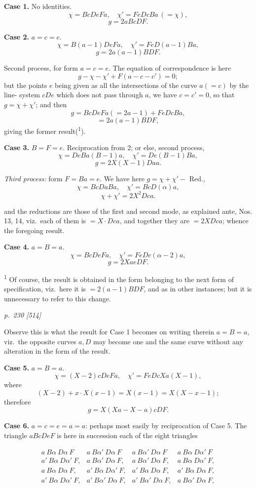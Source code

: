 \documentclass[11pt,a4paper]{article}
\theoremstyle{plain}
\theoremstyle{definition}
\begin{document}
\textbf{Case 1.}  No identities.
\[
\chi=BcDeFa, \quad \chi'=FeDcBa\,(=\chi),
\]
\[
g=2aBcDF.
\]

\textbf{Case 2.}  $a=c=e$.
\[
\chi=B(a-1)DeFa, \quad \chi'=FeD(a-1)Ba,
\]
\[
g=2a(a-1)BDF.
\]

Second process, for form $a=c=e$.  The equation of correspondence is here
\[
g-\chi-\chi'+F(a-c-c')=0;
\]
but the points $e$ being given as all the intersections of the curve $a(=c)$ by the line-
system $cDe$ which does not pass through $a$, we have $c=c'=0$, so that $g=\chi+\chi'$;
and then
\[
g=BcDeFa(=2a-1)+FeDcBa,
\]
\[
=2a(a-1)BDF,
\]
giving the former result(\textsuperscript{1}).

\textbf{Case 3.}  $B=F=e$.  Reciprocation from 2; or else, second process,
\[
\chi=DeBa(B-1)a, \quad \chi'=De(B-1)Ba,
\]
\[
g=2X(X-1)Daa.
\]

\textit{Third process:}  form $F=Ba=e$.  We have here $g=\chi+\chi'-$ Red.,
\[
\chi=BcDaBa, \quad \chi'=BcD(\alpha)a,
\]
\[
\chi+\chi'=2X^2 Dca.
\]

and the reductions are those of the first and second mode, as explained ante, Nos.
13, 14, viz.\ each of them is $=X\cdot Dca$, and together they are $=2XDca$; whence the
foregoing result.

\textbf{Case 4.}  $a=B=a$.
\[
\chi=BcDeFa, \quad \chi'=FeDc(\alpha-2)a,
\]
\[
g=2XaeDF.
\]

\vspace{0.5em}
\noindent\textsuperscript{1} Of course, the result is obtained in the form belonging to the next form of specification, viz.\ here it
is $=2(a-1)BDF$, and as in other instances; but it is unnecessary to refer to this change.

\clearpage

\bigskip
\textit{p.~230 [514]}
\smallskip

Observe this is what the result for Case 1 becomes on writing therein $a=B=a$,
viz.\ the opposite curves $a, D$ may become one and the same curve without any
alteration in the form of the result.

\textbf{Case 5.}  $a=B=a$.
\[
\chi=(X-2)cDeFa, \quad \chi'=FeDcXa(X-1),
\]
where
\[
(X-2)+x\cdot X(x-1)=X(x-1)=X(X-x-1);
\]
therefore
\[
g=X(Xa-X-a)cDF.
\]

\textbf{Case 6.}  $a=c=e=a=a$:  perhaps most easily by reciprocation of Case 5.  The
triangle $aBcDeF$ is here in succession each of the eight triangles

\[
\begin{array}{cccc}
a\ B\alpha\ D\alpha\ F & a\ B\alpha'\ D\alpha\ F & a\ B\alpha'\ D\alpha\ F & a\ B\alpha\ D\alpha'\ F \\
a'\ B\alpha\ D\alpha'\ F, & a\ B\alpha'\ D\alpha\ F, & a\ B\alpha'\ D\alpha\ F, & a\ B\alpha\ D\alpha'\ F, \\
a\ B\alpha\ D\alpha\ F, & a'\ B\alpha\ D\alpha'\ F, & a'\ B\alpha\ D\alpha\ F, & a'\ B\alpha\ D\alpha\ F, \\
a'\ B\alpha\ D\alpha'\ F, & a'\ B\alpha'\ D\alpha\ F, & a'\ B\alpha'\ D\alpha\ F, & a\ B\alpha'\ D\alpha\ F,
\end{array}
\]
\end{document}
